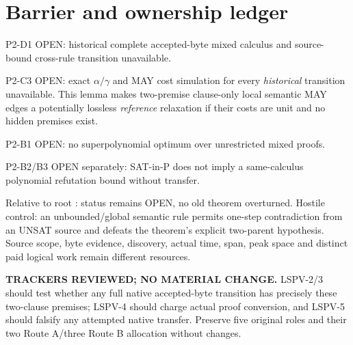 \documentclass[11pt]{article}
\begin{document}
\section*{Barrier and ownership ledger}
\noindent P2-D1 OPEN: historical complete accepted-byte mixed calculus and source-bound cross-rule transition unavailable.\par
\noindent P2-C3 OPEN: exact $\alpha/\gamma$ and MAY cost simulation for every \emph{historical} transition unavailable. This lemma makes two-premise clause-only local semantic MAY edges a potentially lossless \emph{reference} relaxation if their costs are unit and no hidden premises exist.\par
\noindent P2-B1 OPEN: no superpolynomial optimum over unrestricted mixed proofs.\par
\noindent P2-B2/B3 OPEN separately: SAT-in-P does not imply a same-calculus polynomial refutation bound without transfer.\par
\noindent Relative to root : status remains OPEN, no old theorem overturned. Hostile control: an unbounded/global semantic rule permits one-step contradiction from an UNSAT source and defeats the theorem's explicit two-parent hypothesis. Source scope, byte evidence, discovery, actual time, span, peak space and distinct paid logical work remain different resources.\par
\noindent\textbf{TRACKERS REVIEWED; NO MATERIAL CHANGE.} LSPV-2/3 should test whether any full native accepted-byte transition has precisely these two-clause premises; LSPV-4 should charge actual proof conversion, and LSPV-5 should falsify any attempted native transfer. Preserve five original roles and their two Route A/three Route B allocation without changes.
\end{document}
